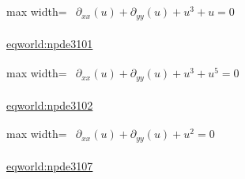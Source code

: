 \documentclass[10pt,a4paper]{article}
\begin{document}
\begin{minipage}{\linewidth}
\begin{center}\begin{adjustbox}{max width=\linewidth}$\displaystyle\begin{gathered}\begin{gathered}\partial_{xx}(u)+\partial_{yy}(u)+u^{3}+u=0\end{gathered}\end{gathered}$\end{adjustbox}\end{center}
{\small \href{https://eqworld.ipmnet.ru/en/solutions/npde/npde3101.pdf}{eqworld:npde3101}}\par
\end{minipage}\par\vspace{7mm}

\begin{minipage}{\linewidth}
\begin{center}\begin{adjustbox}{max width=\linewidth}$\displaystyle\begin{gathered}\begin{gathered}\partial_{xx}(u)+\partial_{yy}(u)+u^{3}+u^{5}=0\end{gathered}\end{gathered}$\end{adjustbox}\end{center}
{\small \href{https://eqworld.ipmnet.ru/en/solutions/npde/npde3102.pdf}{eqworld:npde3102}}\par
\end{minipage}\par\vspace{7mm}

\begin{minipage}{\linewidth}
\begin{center}\begin{adjustbox}{max width=\linewidth}$\displaystyle\begin{gathered}\begin{gathered}\partial_{xx}(u)+\partial_{yy}(u)+u^{2}=0\end{gathered}\end{gathered}$\end{adjustbox}\end{center}
{\small \href{https://eqworld.ipmnet.ru/en/solutions/npde/npde3107.pdf}{eqworld:npde3107}}\par
\end{minipage}\par\vspace{7mm}
\end{document}

